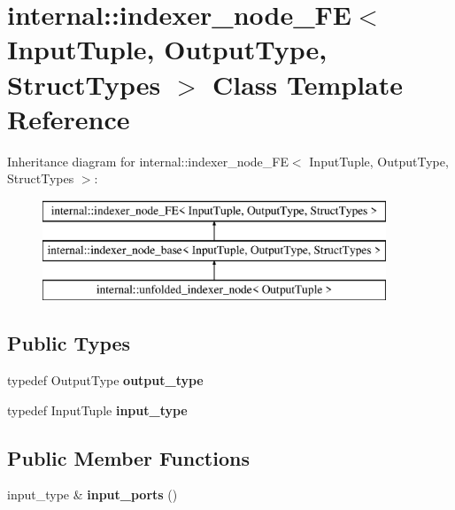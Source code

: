 \hypertarget{classinternal_1_1indexer__node__FE}{}\section{internal\+:\+:indexer\+\_\+node\+\_\+\+F\+E$<$ Input\+Tuple, Output\+Type, Struct\+Types $>$ Class Template Reference}
\label{classinternal_1_1indexer__node__FE}
Inheritance diagram for internal\+:\+:indexer\+\_\+node\+\_\+\+F\+E$<$ Input\+Tuple, Output\+Type, Struct\+Types $>$\+:\begin{figure}[H]
\begin{center}
\leavevmode
\includegraphics[height=3.000000cm]{classinternal_1_1indexer__node__FE}
\end{center}
\end{figure}
\subsection*{Public Types}
\begin{DoxyCompactItemize}
\item 
\hypertarget{classinternal_1_1indexer__node__FE_afa7dd8ad41b055c1edba74bb28c9f817}{}typedef Output\+Type {\bfseries output\+\_\+type}\label{classinternal_1_1indexer__node__FE_afa7dd8ad41b055c1edba74bb28c9f817}

\item 
\hypertarget{classinternal_1_1indexer__node__FE_a28f2905bae50b765d9b50a23213d9635}{}typedef Input\+Tuple {\bfseries input\+\_\+type}\label{classinternal_1_1indexer__node__FE_a28f2905bae50b765d9b50a23213d9635}

\end{DoxyCompactItemize}
\subsection*{Public Member Functions}
\begin{DoxyCompactItemize}
\item 
\hypertarget{classinternal_1_1indexer__node__FE_af2d2a41581d12f816e922e33fb43b206}{}input\+\_\+type \& {\bfseries input\+\_\+ports} ()\label{classinternal_1_1indexer__node__FE_af2d2a41581d12f816e922e33fb43b206}

\end{DoxyCompactItemize}
